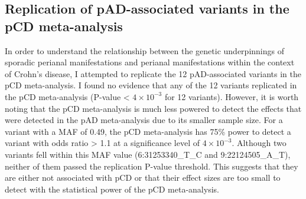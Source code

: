 \subsection{Replication of pAD-associated variants in the pCD meta-analysis}
In order to understand the relationship between the genetic underpinnings of sporadic perianal manifestations and perianal manifestations within the context of Crohn's disease, I attempted to replicate the 12 pAD-associated variants in the pCD meta-analysis. I found no evidence that any of the 12 variants replicated in the pCD meta-analysis (P-value < $4\times10^{-3}$ for 12 variants). However, it is worth noting that the pCD meta-analysis is much less powered to detect the effects that were detected in the pAD meta-analysis due to its smaller sample size. For a variant with a MAF of 0.49, the pCD meta-analysis has 75\% power to detect a variant with odds ratio > 1.1 at a significance level of $4\times10^{-3}$. Although two variants fell within this MAF value (6:31253340\_T\_C and 9:22124505\_A\_T), neither of them passed the replication P-value threshold. This suggests that they are either not associated with pCD or that their effect sizes are too small to detect with the statistical power of the pCD meta-analysis. 
